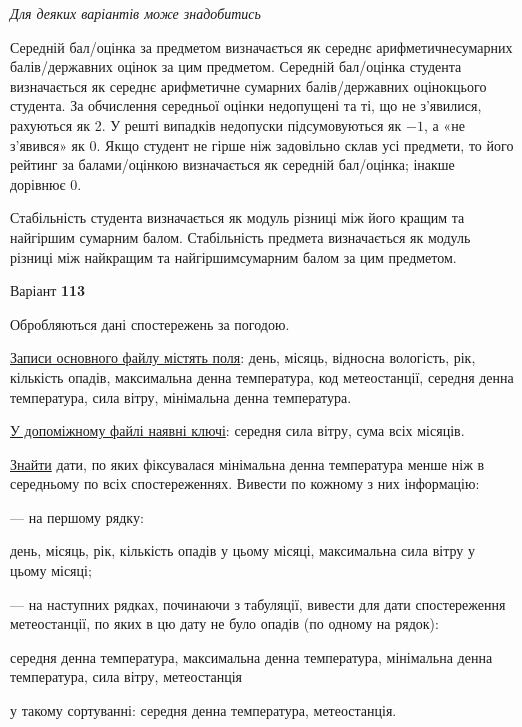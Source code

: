 \documentclass[11pt, ukrainian]{article}
\begin{document}
\bigskip\textit{Для деяких варіантів може знадобитись}

Середній бал/оцінка за предметом визначається як середнє арифметичнесумарних балів/державних оцінок за цим предметом. 
Середній бал/оцінка студента визначається як середнє арифметичне сумарних балів/державних оцінокцього студента. 
За обчислення середньої оцінки недопущені та ті, що не з’явилися, рахуються як 2.
У решті випадків недопуски підсумовуються як $-1$, а «не з’явився» як 0.
Якщо студент не гірше ніж задовільно склав усі предмети, 
то його рейтинг за балами/оцінкою визначається як середній бал/оцінка; інакше дорівнює 0.

Стабільність студента визначається як модуль різниці між його кращим та найгіршим сумарним балом.
Стабільність предмета визначається як модуль різниці між найкращим та найгіршимсумарним балом за цим предметом.






\par
\newpage
{\center Варіант  \No \textbf { 113 }\par}
\bigskip
Обробляються дані спостережень за погодою. 

\underline{Записи основного файлу містять поля}: день, місяць, відносна вологість, рік, кількість опадів, максимальна денна температура, код метеостанції, середня денна температура, сила вітру, мінімальна денна температура.

\underline{У допоміжному файлі наявні ключі}: середня сила вітру, сума всіх місяців.

\underline{Знайти} дати, по яких фіксувалася мінімальна денна температура менше ніж в середньому по всіх спостереженнях. Вивести по кожному з них інформацію:\par
{\noindent}--- на першому рядку:\par
день, місяць, рік, кількість опадів у цьому місяці, максимальна сила вітру у цьому місяці;

{\noindent}--- на наступних рядках, починаючи з табуляції, вивести для дати спостереження метеостанції, по яких в цю дату не було опадів (по одному на рядок):\par
середня денна температура, максимальна денна температура, мінімальна денна температура, сила вітру, метеостанція

{\noindent}у такому сортуванні: середня денна температура, метеостанція.

\end{document}
